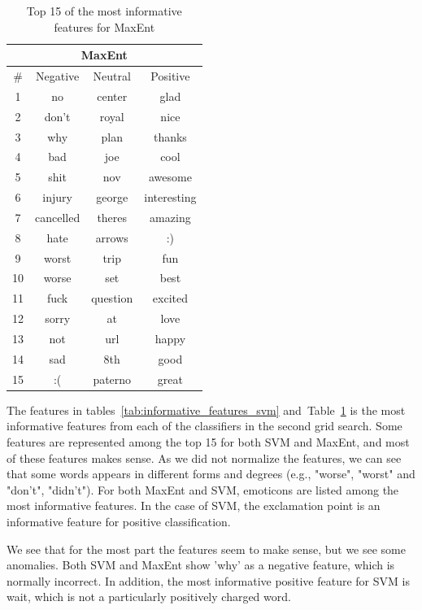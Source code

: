 \begin{table}[!htb]
	\centering
	\begin{tabular}{|c|c|c|c|}		
	\multicolumn{4}{c}{MaxEnt} \\ \hline
	
	\# & Negative & Neutral & Positive \\ \hline\hline
	
	1 & no 	& center & glad \\ \hline
	2 & don't 	& royal & nice \\ \hline
	3 & why 	& plan & thanks \\ \hline
	4 & bad 	& joe & cool \\ \hline
	5 & shit 	& nov & awesome \\ \hline
	6 & injury 	& george & interesting \\ \hline
	7 & cancelled 	& theres & amazing \\ \hline
	8 & hate 	& arrows & :) \\ \hline
	9 & worst 	& trip & fun \\ \hline
	10 & worse 	& set & best \\ \hline
	11 & fuck 	& question & excited \\ \hline
	12 & sorry 	& at & love \\ \hline
	13 & not 	& url & happy \\ \hline
	14 & sad 	& 8th & good \\ \hline
	15 & :( 	& paterno & great \\ \hline
	\end{tabular}
	
	\caption[Most informative features]{Top 15 of the most informative features for MaxEnt}
	\label{tab:informative_features_maxent}
\end{table}


The features in tables~\ref{tab:informative_features_svm} and~Table~\ref{tab:informative_features_maxent}  is the most informative features from each of the classifiers in the second grid search. Some features are represented among the top 15 for both SVM and MaxEnt, and most of these features makes sense. As we did not normalize the features, we can see that some words appears in different forms and degrees (e.g., "worse", "worst" and "don't", "didn't"). For both MaxEnt and SVM, emoticons are listed among the most informative features. In the case of SVM, the exclamation point is an informative feature for positive classification.

We see that for the most part the features seem to make sense, but we see some anomalies. Both SVM and MaxEnt show 'why' as a negative feature, which is normally incorrect. In addition, the most informative positive feature for SVM is wait, which is not a particularly positively charged word.


